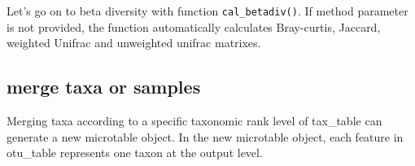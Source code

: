 \documentclass[
]{book}
\newenvironment{Shaded}{\begin{snugshade}}{\end{snugshade}}
\newcommand{\AttributeTok}[1]{\textcolor[rgb]{0.77,0.63,0.00}{#1}}
\newcommand{\CommentTok}[1]{\textcolor[rgb]{0.56,0.35,0.01}{\textit{#1}}}
\newcommand{\ConstantTok}[1]{\textcolor[rgb]{0.00,0.00,0.00}{#1}}
\newcommand{\FunctionTok}[1]{\textcolor[rgb]{0.00,0.00,0.00}{#1}}
\newcommand{\NormalTok}[1]{#1}
\newcommand{\OtherTok}[1]{\textcolor[rgb]{0.56,0.35,0.01}{#1}}
\newcommand{\SpecialCharTok}[1]{\textcolor[rgb]{0.00,0.00,0.00}{#1}}
\newcommand{\StringTok}[1]{\textcolor[rgb]{0.31,0.60,0.02}{#1}}
\begin{document}
\begin{Shaded}
\end{Shaded}

Let's go on to beta diversity with function \texttt{cal\_betadiv()}.
If method parameter is not provided, the function automatically calculates Bray-curtis, Jaccard, weighted Unifrac and unweighted unifrac matrixes.

\begin{Shaded}
\end{Shaded}

\hypertarget{merge-taxa-or-samples}{%
\subsection{merge taxa or samples}\label{merge-taxa-or-samples}}

Merging taxa according to a specific taxonomic rank level of tax\_table can generate a new microtable object.
In the new microtable object, each feature in otu\_table represents one taxon at the output level.

\begin{Shaded}
\end{Shaded}
\end{document}
